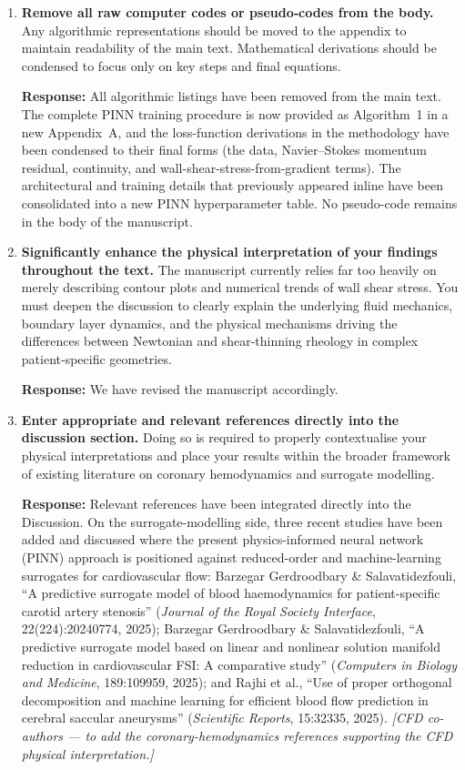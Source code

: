 \documentclass[11pt]{article}
\begin{document}
\begin{enumerate}[label=\textbf{\arabic*.}, leftmargin=*, resume]

\item \textbf{Remove all raw computer codes or pseudo‑codes from the body.}
  Any algorithmic representations should be moved to the appendix to maintain readability of the main text. Mathematical derivations should be condensed to focus only on key steps and final equations.

  \textbf{Response:} All algorithmic listings have been removed from the main text. The complete PINN training procedure is now provided as Algorithm~1 in a new Appendix~A, and the loss-function derivations in the methodology have been condensed to their final forms (the data, Navier--Stokes momentum residual, continuity, and wall-shear-stress-from-gradient terms). The architectural and training details that previously appeared inline have been consolidated into a new PINN hyperparameter table. No pseudo-code remains in the body of the manuscript.

\item \textbf{Significantly enhance the physical interpretation of your findings throughout the text.}
  The manuscript currently relies far too heavily on merely describing contour plots and numerical trends of wall shear stress. You must deepen the discussion to clearly explain the underlying fluid mechanics, boundary layer dynamics, and the physical mechanisms driving the differences between Newtonian and shear‑thinning rheology in complex patient‑specific geometries.

  \textbf{Response:} We have revised the manuscript accordingly.

\item \textbf{Enter appropriate and relevant references directly into the discussion section.}
  Doing so is required to properly contextualise your physical interpretations and place your results within the broader framework of existing literature on coronary hemodynamics and surrogate modelling.

  \textbf{Response:} Relevant references have been integrated directly into the Discussion. On the surrogate-modelling side, three recent studies have been added and discussed where the present physics-informed neural network (PINN) approach is positioned against reduced-order and machine-learning surrogates for cardiovascular flow: Barzegar Gerdroodbary \& Salavatidezfouli, ``A predictive surrogate model of blood haemodynamics for patient-specific carotid artery stenosis'' (\emph{Journal of the Royal Society Interface}, 22(224):20240774, 2025); Barzegar Gerdroodbary \& Salavatidezfouli, ``A predictive surrogate model based on linear and nonlinear solution manifold reduction in cardiovascular FSI: A comparative study'' (\emph{Computers in Biology and Medicine}, 189:109959, 2025); and Rajhi et al., ``Use of proper orthogonal decomposition and machine learning for efficient blood flow prediction in cerebral saccular aneurysms'' (\emph{Scientific Reports}, 15:32335, 2025). \textit{[CFD co-authors --- to add the coronary-hemodynamics references supporting the CFD physical interpretation.]}

\end{enumerate}
\end{document}
